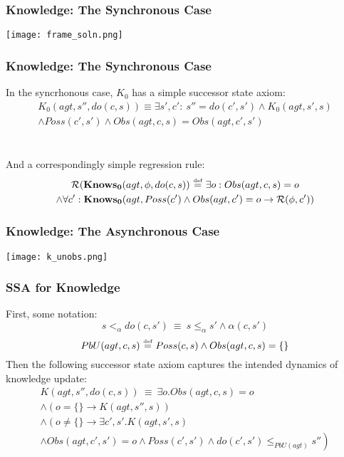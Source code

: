 \documentclass{beamer}
\newcommand{\isdef}{\hbox{$\stackrel{\mbox{\tiny def}}{=}$}}
\newcommand{\Reg}{\mathcal{R}}
\newcommand{\KnowsZ}{\mathbf{Knows_{0}}}
\begin{document}
\begin{frame}
\frametitle{Knowledge: The Synchronous Case}
\begin{center}
  \texttt{[image: frame\_soln.png]}
\end{center}
\end{frame}

\begin{frame}
\frametitle{Knowledge: The Synchronous Case}
In the syncrhonous case, $K_0$ has a simple successor state axiom:
\begin{multline*}
 K_0(agt,s'',do(c,s)) \equiv \exists s',c':\ s''=do(c',s') \wedge K_0(agt,s',s)\\
  \wedge Poss(c',s') \wedge Obs(agt,c,s) = Obs(agt,c',s')
\end{multline*}
\ \\
\ \\
And a correspondingly simple regression rule:
\begin{multline*}
 \Reg(\KnowsZ(agt,\phi,do(c,s))\ \isdef\ \exists o: Obs(agt,c,s)=o\\
  \wedge \forall c': \KnowsZ(agt,Poss(c')\wedge Obs(agt,c')=o \rightarrow \Reg(\phi,c'))
\end{multline*}
\end{frame}

\begin{frame}
\frametitle{Knowledge: The Asynchronous Case}
\begin{center}
  \texttt{[image: k\_unobs.png]}
\end{center}
\end{frame}

\begin{frame}
\frametitle{SSA for Knowledge}
First, some notation:
\begin{equation*}
  s <_{\alpha} do(c,s')\ \equiv\ s \leq_{\alpha} s' \wedge \alpha(c,s')
\end{equation*}
\begin{equation*}
  PbU(agt,c,s)\ \isdef\ Poss(c,s) \wedge Obs(agt,c,s) = \{\}
\end{equation*}
\pause
Then the following successor state axiom captures the intended dynamics of
knowledge update:
\begin{multline*}
  K(agt,s'',do(c,s))\ \equiv\ \exists o . Obs(agt,c,s) = o  \\
  \wedge \left(o = \{\} \rightarrow K(agt,s'',s)\right) \\
  \wedge \left(o \neq \{\} \rightarrow \exists c',s' . K(agt,s',s)\right. \\
  \left.\wedge Obs(agt,c',s') = o \wedge Poss(c',s') \wedge do(c',s') \leq_{PbU(agt)} s''\right)
\end{multline*}
\end{frame}
\end{document}

